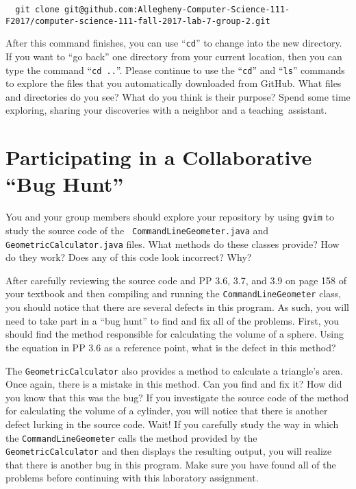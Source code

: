 \documentclass[11pt]{article}
\newcommand{\command}[1]{``\lstinline{#1}''}
\newcommand{\step}[1]{``{#1}''}
\begin{document}
\begin{lstlisting}
  git clone git@github.com:Allegheny-Computer-Science-111-F2017/computer-science-111-fall-2017-lab-7-group-2.git
\end{lstlisting}

After this command finishes, you can use \command{cd} to change into the new directory. If you want to \step{go back}
one directory from your current location, then you can type the command \command{cd ..}. Please continue to use the
\command{cd} and \command{ls} commands to explore the files that you automatically downloaded from GitHub. What files
and directories do you see? What do you think is their purpose? Spend some time exploring, sharing your discoveries with
a neighbor and a \mbox{teaching assistant}.

\section*{Participating in a Collaborative ``Bug Hunt''}

You and your group members should explore your repository by using {\tt gvim} to study the source code of the {\tt
CommandLineGeometer.java} and {\tt GeometricCalculator.java} files. What methods do these classes provide? How do they
work? Does any of this code look incorrect? Why?

After carefully reviewing the source code and PP 3.6, 3.7, and 3.9 on page 158 of your textbook and then compiling and
running the {\tt CommandLineGeometer} class, you should notice that there are several defects in this program. As such,
you will need to take part in a ``bug hunt'' to find and fix all of the problems. First, you should find the method
responsible for calculating the volume of a sphere. Using the equation in PP 3.6 as a reference point, what is the
defect in this method?

The {\tt GeometricCalculator} also provides a method to calculate a triangle's area. Once again, there is a mistake in
this method. Can you find and fix it? How did you know that this was the bug? If you investigate the source code of the
method for calculating the volume of a cylinder, you will notice that there is another defect lurking in the source
code. Wait! If you carefully study the way in which the {\tt CommandLineGeometer} calls the method provided by the {\tt
GeometricCalculator} and then displays the resulting output, you will realize that there is another bug in this program.
Make sure you have found all of the problems before continuing with this laboratory assignment.
\end{document}
